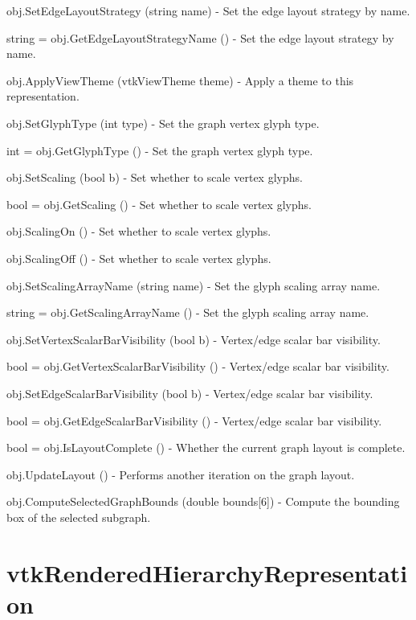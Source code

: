 \begin{DoxyItemize}
\item {\ttfamily obj.\-Set\-Edge\-Layout\-Strategy (string name)} -\/ Set the edge layout strategy by name.  
\item {\ttfamily string = obj.\-Get\-Edge\-Layout\-Strategy\-Name ()} -\/ Set the edge layout strategy by name.  
\item {\ttfamily obj.\-Apply\-View\-Theme (vtk\-View\-Theme theme)} -\/ Apply a theme to this representation.  
\item {\ttfamily obj.\-Set\-Glyph\-Type (int type)} -\/ Set the graph vertex glyph type.  
\item {\ttfamily int = obj.\-Get\-Glyph\-Type ()} -\/ Set the graph vertex glyph type.  
\item {\ttfamily obj.\-Set\-Scaling (bool b)} -\/ Set whether to scale vertex glyphs.  
\item {\ttfamily bool = obj.\-Get\-Scaling ()} -\/ Set whether to scale vertex glyphs.  
\item {\ttfamily obj.\-Scaling\-On ()} -\/ Set whether to scale vertex glyphs.  
\item {\ttfamily obj.\-Scaling\-Off ()} -\/ Set whether to scale vertex glyphs.  
\item {\ttfamily obj.\-Set\-Scaling\-Array\-Name (string name)} -\/ Set the glyph scaling array name.  
\item {\ttfamily string = obj.\-Get\-Scaling\-Array\-Name ()} -\/ Set the glyph scaling array name.  
\item {\ttfamily obj.\-Set\-Vertex\-Scalar\-Bar\-Visibility (bool b)} -\/ Vertex/edge scalar bar visibility.  
\item {\ttfamily bool = obj.\-Get\-Vertex\-Scalar\-Bar\-Visibility ()} -\/ Vertex/edge scalar bar visibility.  
\item {\ttfamily obj.\-Set\-Edge\-Scalar\-Bar\-Visibility (bool b)} -\/ Vertex/edge scalar bar visibility.  
\item {\ttfamily bool = obj.\-Get\-Edge\-Scalar\-Bar\-Visibility ()} -\/ Vertex/edge scalar bar visibility.  
\item {\ttfamily bool = obj.\-Is\-Layout\-Complete ()} -\/ Whether the current graph layout is complete.  
\item {\ttfamily obj.\-Update\-Layout ()} -\/ Performs another iteration on the graph layout.  
\item {\ttfamily obj.\-Compute\-Selected\-Graph\-Bounds (double bounds\mbox{[}6\mbox{]})} -\/ Compute the bounding box of the selected subgraph.  
\end{DoxyItemize}\hypertarget{vtkviews_vtkrenderedhierarchyrepresentation}{}\section{vtk\-Rendered\-Hierarchy\-Representation}\label{vtkviews_vtkrenderedhierarchyrepresentation}
